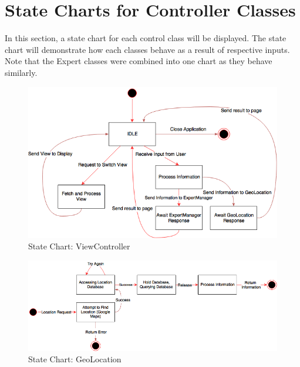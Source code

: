 \documentclass[]{article}
\begin{document}
\section{State Charts for Controller Classes}
\label{sec:state_charts_for_controller_classes}
In this section, a state chart for each control class will be displayed. The state chart will demonstrate how each classes behave as a result of respective inputs. Note that the Expert classes were combined into one chart as they behave similarly.  
\begin{figure}[H]
	\includegraphics[width=\textwidth]{images/ViewController.png}
	\caption{State Chart: ViewController}
\end{figure}
\begin{figure}[H]
	\includegraphics[width=\textwidth]{images/GeoLocation.png}
	\caption{State Chart: GeoLocation}
\end{figure}
\end{document}

